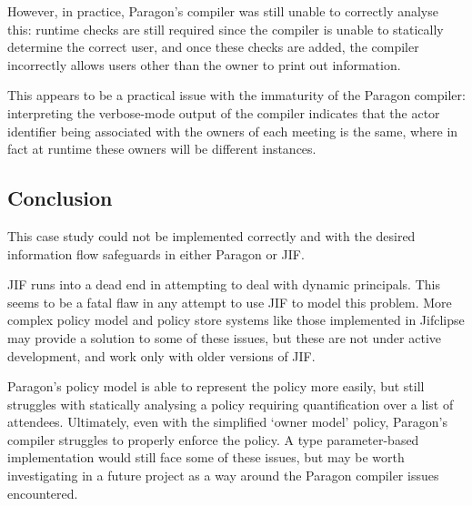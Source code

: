  However, in practice, Paragon's compiler was still unable to correctly analyse this: runtime checks are still required since the compiler is unable to statically determine the correct user, and once these checks are added, the compiler incorrectly allows users other than the owner to print out information.

This appears to be a practical issue with the immaturity of the Paragon compiler: interpreting the verbose-mode output of the compiler indicates that the actor identifier being associated with the owners of each meeting is the same, where in fact at runtime these owners will be different instances.

\subsection{Conclusion}

This case study could not be implemented correctly and with the desired information flow safeguards in either Paragon or JIF.

JIF runs into a dead end in attempting to deal with dynamic principals. This seems to be a fatal flaw in any attempt to use JIF to model this problem. More complex policy model and policy store systems like those implemented in Jifclipse \cite{hicks2007jifclipse} may provide a solution to some of these issues, but these are not under active development, and work only with older versions of JIF.

Paragon's policy model is able to represent the policy more easily, but still struggles with statically analysing a policy requiring quantification over a list of attendees. Ultimately, even with the simplified `owner model' policy, Paragon's compiler struggles to properly enforce the policy. A type parameter-based implementation would still face some of these issues, but may be worth investigating in a future project as a way around the Paragon compiler issues encountered.
